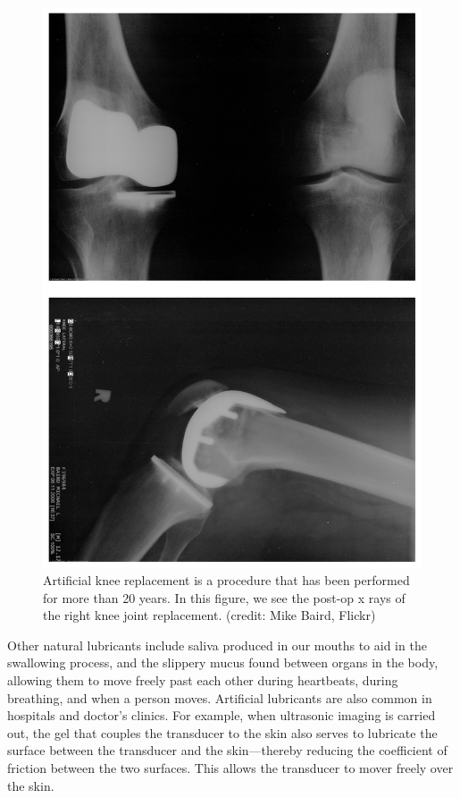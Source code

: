 \documentclass[
]{book}
\begin{document}
\begin{figure}
\hypertarget{import-auto-id1165296217318}{%
\centering
\includegraphics{images/Figure_06_01_02a.jpg}
\caption{Artificial knee replacement is a procedure that has been performed for
more than 20 years. In this figure, we see the post-op x rays of the
right knee joint replacement. (credit: Mike Baird,
Flickr)}\label{import-auto-id1165296217318}
}
\end{figure}

Other natural lubricants include saliva produced in our mouths to aid in
the swallowing process, and the slippery mucus found between organs in
the body, allowing them to move freely past each other during
heartbeats, during breathing, and when a person moves. Artificial
lubricants are also common in hospitals and doctor's clinics. For
example, when ultrasonic imaging is carried out, the gel that couples
the transducer to the skin also serves to lubricate the surface between
the transducer and the skin---thereby reducing the coefficient of
friction between the two surfaces. This allows the transducer to mover
freely over the skin.
\end{document}
